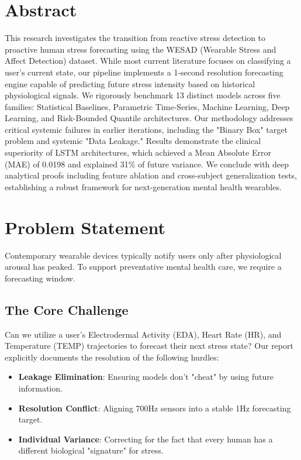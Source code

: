 \documentclass[12pt,a4paper,oneside]{report}
\begin{document}
\chapter{Abstract}
This research investigates the transition from reactive stress detection to proactive human stress forecasting using the WESAD (Wearable Stress and Affect Detection) dataset. While most current literature focuses on classifying a user's current state, our pipeline implements a 1-second resolution forecasting engine capable of predicting future stress intensity based on historical physiological signals. We rigorously benchmark 13 distinct models across five families: Statistical Baselines, Parametric Time-Series, Machine Learning, Deep Learning, and Risk-Bounded Quantile architectures. Our methodology addresses critical systemic failures in earlier iterations, including the "Binary Box" target problem and systemic "Data Leakage." Results demonstrate the clinical superiority of LSTM architectures, which achieved a Mean Absolute Error (MAE) of 0.0198 and explained 31\% of future variance. We conclude with deep analytical proofs including feature ablation and cross-subject generalization tests, establishing a robust framework for next-generation mental health wearables.

\chapter{Problem Statement}
Contemporary wearable devices typically notify users only after physiological arousal has peaked. To support preventative mental health care, we require a forecasting window. 

\section{The Core Challenge}
Can we utilize a user's Electrodermal Activity (EDA), Heart Rate (HR), and Temperature (TEMP) trajectories to forecast their next stress state? 
Our report explicitly documents the resolution of the following hurdles:
\begin{itemize}
    \item \textbf{Leakage Elimination}: Ensuring models don't "cheat" by using future information.
    \item \textbf{Resolution Conflict}: Aligning 700Hz sensors into a stable 1Hz forecasting target.
    \item \textbf{Individual Variance}: Correcting for the fact that every human has a different biological "signature" for stress.
\end{itemize}
\end{document}
